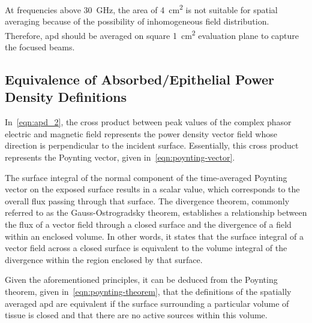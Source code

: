 At frequencies above \SI{30}{\GHz}, the area of \SI{4}{\cm\squared} is not suitable for spatial averaging because of the possibility of inhomogeneous field distribution.
Therefore, \gls{apd} should be averaged on square \SI{1}{\cm\squared} evaluation plane to capture the focused beams.

\subsection{Equivalence of Absorbed/Epithelial Power Density Definitions}
In~\cref{eqn:apd_2}, the cross product between peak values of the complex phasor electric and magnetic field represents the power density vector field whose direction is perpendicular to the incident surface.
Essentially, this cross product represents the Poynting vector, given in~\cref{eqn:poynting-vector}.

The surface integral of the normal component of the time-averaged Poynting vector on the exposed surface results in a scalar value, which corresponds to the overall flux passing through that surface.
The divergence theorem, commonly referred to as the Gauss-Ostrogradsky theorem, establishes a relationship between the flux of a vector field through a closed surface and the divergence of a field within an enclosed volume.
In other words, it states that the surface integral of a vector field across a closed surface is equivalent to the volume integral of the divergence within the region enclosed by that surface.

Given the aforementioned principles, it can be deduced from the Poynting theorem, given in~\cref{eqn:poynting-theorem}, that the definitions of the spatially averaged \gls{apd} are equivalent if the surface surrounding a particular volume of tissue is closed and that there are no active sources within this volume.

